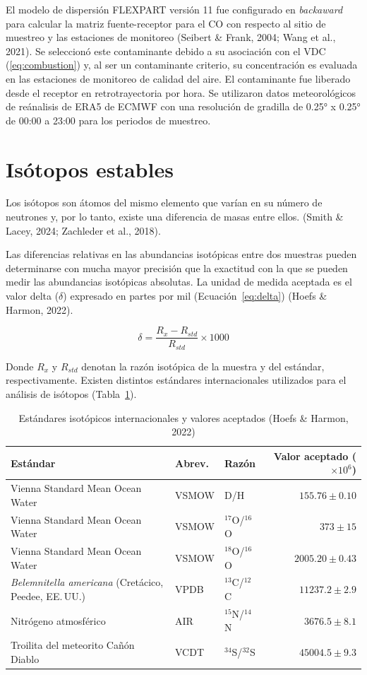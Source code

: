 El modelo de dispersión FLEXPART versión 11 fue configurado en 
\textit{backaward} para calcular la matriz fuente-receptor
para el CO con respecto al sitio de muestreo y las estaciones 
de monitoreo (Seibert \& Frank, 2004; Wang et al., 2021). Se 
seleccionó este contaminante debido a su asociación con el VDC (\ref{eq:combustion})
y, al ser un contaminante criterio, su concentración es evaluada en las 
estaciones de monitoreo de calidad del aire. 
El contaminante fue liberado desde el receptor 
en retrotrayectoria por hora. Se utilizaron datos meteorológicos
de reánalisis de ERA5 de ECMWF con una resolución de gradilla de  0.25° x 0.25° de 00:00 a 
23:00 para los periodos de muestreo. 

\section{Isótopos estables}
Los isótopos son átomos del mismo elemento que varían en su número de 
neutrones y, por lo tanto, existe una diferencia de masas entre ellos. 
(Smith \& Lacey, 2024; Zachleder et al., 2018). 

Las diferencias relativas en las abundancias isotópicas entre dos muestras 
pueden determinarse con mucha mayor precisión que la exactitud con la que 
se pueden medir las abundancias isotópicas absolutas. 
La unidad de medida aceptada es el valor delta ($\delta$) expresado en partes 
por mil (Ecuación~\ref{eq:delta}) (Hoefs \& Harmon, 2022).

\begin{equation}
\delta = \frac{R_x - R_{std}}{R_{std}} \times 1000
\label{eq:delta}
\end{equation}

Donde $R_x$ y $R_{std}$ denotan la razón isotópica de la muestra y
del estándar, respectivamente. 
Existen distintos estándares internacionales utilizados para el 
análisis de isótopos (Tabla~\ref{tab:estandares}).

\begin{table}[h!]
\centering
\small
\caption{Estándares isotópicos internacionales y valores aceptados
(Hoefs \& Harmon, 2022)}
\label{tab:estandares}
\begin{tabularx}{\textwidth}{@{}X l l r@{}}
\toprule
\textbf{Estándar} & \textbf{Abrev.} & \textbf{Razón} &
\textbf{Valor aceptado ($\times 10^{6}$)} \\
\midrule
Vienna Standard Mean Ocean Water & VSMOW & D/H & $155.76 \pm 0.10$ \\
Vienna Standard Mean Ocean Water & VSMOW & $^{17}$O/$^{16}$O & $373 \pm 15$ \\
Vienna Standard Mean Ocean Water & VSMOW & $^{18}$O/$^{16}$O & $2005.20 \pm 0.43$ \\
\textit{Belemnitella americana} (Cretácico, Peedee, EE.\,UU.) & VPDB & $^{13}$C/$^{12}$C & $11237.2 \pm 2.9$ \\
Nitrógeno atmosférico & AIR & $^{15}$N/$^{14}$N & $3676.5 \pm 8.1$ \\
Troilita del meteorito Cañón Diablo & VCDT & $^{34}$S/$^{32}$S & $45004.5 \pm 9.3$ \\
\bottomrule
\end{tabularx}
\end{table}


